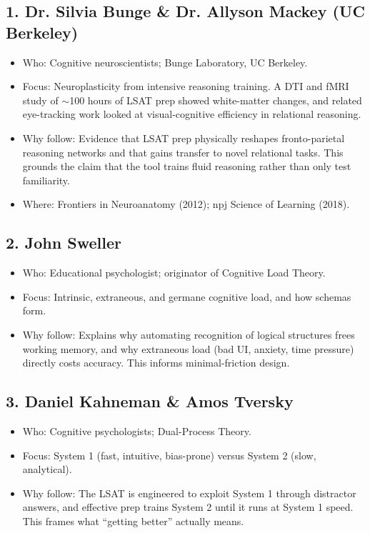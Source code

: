 \documentclass[11pt]{article}
\begin{document}
\subsection*{1. Dr. Silvia Bunge \& Dr. Allyson Mackey (UC Berkeley)}
\begin{itemize}
\item Who: Cognitive neuroscientists; Bunge Laboratory, UC Berkeley.
\item Focus: Neuroplasticity from intensive reasoning training. A DTI and fMRI study of $\sim$100 hours of LSAT prep showed white-matter changes, and related eye-tracking work looked at visual-cognitive efficiency in relational reasoning.
\item Why follow: Evidence that LSAT prep physically reshapes fronto-parietal reasoning networks and that gains transfer to novel relational tasks. This grounds the claim that the tool trains fluid reasoning rather than only test familiarity.
\item Where: Frontiers in Neuroanatomy (2012); npj Science of Learning (2018).
\end{itemize}

\subsection*{2. John Sweller}
\begin{itemize}
\item Who: Educational psychologist; originator of Cognitive Load Theory.
\item Focus: Intrinsic, extraneous, and germane cognitive load, and how schemas form.
\item Why follow: Explains why automating recognition of logical structures frees working memory, and why extraneous load (bad UI, anxiety, time pressure) directly costs accuracy. This informs minimal-friction design.
\end{itemize}

\subsection*{3. Daniel Kahneman \& Amos Tversky}
\begin{itemize}
\item Who: Cognitive psychologists; Dual-Process Theory.
\item Focus: System 1 (fast, intuitive, bias-prone) versus System 2 (slow, analytical).
\item Why follow: The LSAT is engineered to exploit System 1 through distractor answers, and effective prep trains System 2 until it runs at System 1 speed. This frames what \enquote{getting better} actually means.
\end{itemize}
\end{document}
